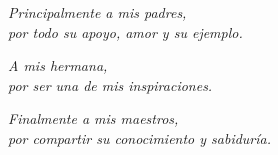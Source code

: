 
\vspace*{\fill}

\begin{flushright}
    \textit{Principalmente a mis padres,\\
    por todo su apoyo, amor y su ejemplo.}
    
    \vspace{1em}

    \textit{A mis hermana, \\
    por ser una de mis inspiraciones.}

    \vspace{1em}
    
    \textit{Finalmente a mis maestros,\\
    por compartir su conocimiento y sabiduría.}
\end{flushright}

\vspace*{\fill}
\MediaOptionLogic

